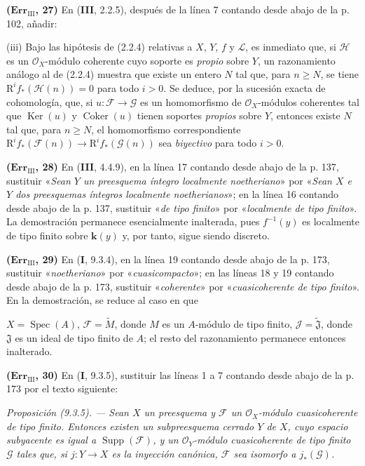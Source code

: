 \noindent\textbf{($\mathbf{Err}_{\mathrm{III}}$, 27)} En (\textbf{III}, 2.2.5),
después de la línea 7 contando desde abajo de la p. 102, añadir:

(iii) Bajo las hipótesis de (2.2.4) relativas a $X$, $Y$, $f$ y $\mathscr L$,
es inmediato que, si $\mathscr H$ es un $\mathscr O_X$-módulo coherente cuyo
soporte es \emph{propio} sobre $Y$, un razonamiento análogo al de (2.2.4)
muestra que existe un entero $N$ tal que, para $n\geq N$, se tiene
$\mathrm R^if_*(\mathscr H(n))=0$ para todo $i>0$. Se deduce, por la sucesión
exacta de cohomología, que, si $u:\mathscr F\to\mathscr G$ es un homomorfismo
de $\mathscr O_X$-módulos coherentes tal que $\operatorname{Ker}(u)$ y
$\operatorname{Coker}(u)$ tienen soportes \emph{propios} sobre $Y$, entonces
existe $N$ tal que, para $n\geq N$, el homomorfismo correspondiente
$\mathrm R^if_*(\mathscr F(n))\to\mathrm R^if_*(\mathscr G(n))$ sea
\emph{biyectivo} para todo $i>0$.

\noindent\textbf{($\mathbf{Err}_{\mathrm{III}}$, 28)} En (\textbf{III}, 4.4.9), en la
línea 17 contando desde abajo de la p. 137, sustituir «\emph{Sean $Y$ un
preesquema íntegro localmente noetheriano}» por «\emph{Sean $X$ e $Y$ dos
preesquemas íntegros localmente noetherianos}»; en la línea 16 contando desde
abajo de la p. 137, sustituir «\emph{de tipo finito}» por «\emph{localmente de
tipo finito}». La demostración permanece esencialmente inalterada, pues
$f^{-1}(y)$ es localmente de tipo finito sobre $\boldsymbol{k}(y)$ y, por tanto, sigue
siendo discreto.

\noindent\textbf{($\mathbf{Err}_{\mathrm{III}}$, 29)} En (\textbf I, 9.3.4), en la
línea 19 contando desde abajo de la p. 173, sustituir «\emph{noetheriano}» por
«\emph{cuasicompacto}»; en las líneas 18 y 19 contando desde abajo de la p.
173, sustituir «\emph{coherente}» por «\emph{cuasicoherente de tipo finito}».
En la demostración, se reduce al caso en que

$X=\operatorname{Spec}(A)$, $\mathscr F=\widetilde M$, donde $M$ es un
$A$-módulo de tipo finito, $\mathscr J=\widetilde{\mathfrak J}$, donde
$\mathfrak J$ es un ideal de tipo finito de $A$; el resto del razonamiento
permanece entonces inalterado.

\noindent\textbf{($\mathbf{Err}_{\mathrm{III}}$, 30)} En (\textbf I, 9.3.5),
sustituir las líneas 1 a 7 contando desde abajo de la p. 173 por el texto
siguiente:

\emph{Proposición (9.3.5). --- Sean $X$ un preesquema y $\mathscr F$ un
$\mathscr O_X$-módulo cuasicoherente de tipo finito. Entonces existen un
subpreesquema cerrado $Y$ de $X$, cuyo espacio subyacente es igual a
$\operatorname{Supp}(\mathscr F)$, y un $\mathscr O_Y$-módulo cuasicoherente de
tipo finito $\mathscr G$ tales que, si $j:Y\to X$ es la inyección canónica,
$\mathscr F$ sea isomorfo a $j_*(\mathscr G)$.}

